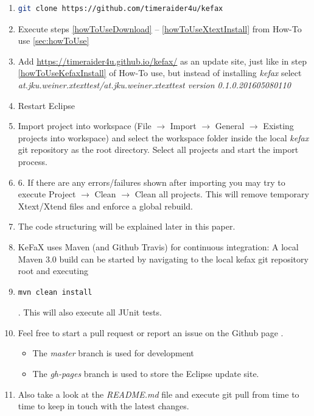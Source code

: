 \begin{enumerate}
 \item \begin{lstlisting}[language=Bash,breaklines=true,]
        git clone https://github.com/timeraider4u/kefax
       \end{lstlisting}
 \item Execute steps \ref{howToUseDownload} -- \ref{howToUseXtextInstall} from How-To use \ref{sec:howToUse}
 \item Add \url{https://timeraider4u.github.io/kefax/}\cite{Kefax_URL} as an update site, 
 just like in step \ref{howToUseKefaxInstall} of How-To use, but instead of installing {\it kefax} 
 select {\it at.jku.weiner.xtexttest/at.jku.weiner.xtexttest version 0.1.0.201605080110}
 \item Restart Eclipse
 \item Import project into workspace (File $\rightarrow$ Import $\rightarrow$ General $\rightarrow$ 
 Existing projects into workspace) and select the workspace folder inside the local {\it kefax}
 git repository as the root directory. Select all projects and start the import process.
 \item 6. If there are any errors/failures shown after importing you may try to execute 
 Project $\rightarrow$ Clean $\rightarrow$ Clean all projects.
 This will remove temporary Xtext/Xtend files and enforce a global rebuild.
 \item The code structuring will be explained later in this paper. 
 \item KeFaX uses Maven (and Github Travis) for continuous integration:
 A local Maven 3.0 build can be started by navigating to the local kefax git repository root and executing 
 \item \begin{lstlisting}[language=Bash,breaklines=true,]
 mvn clean install
 \end{lstlisting}. This will also execute all JUnit tests.
 \item Feel free to start a pull request or report an issue on the Github page \cite{Kefax2_URL}.
  \begin{itemize}
   \item The {\it master} branch is used for development
   \item The {\it gh-pages} branch is used to store the Eclipse update site. 
  \end{itemize}
 \item Also take a look at the {\it README.md} file 
 and execute git pull from time to time to keep in touch with the latest changes. 
\end{enumerate}

